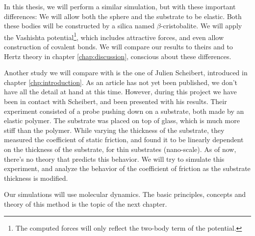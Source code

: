 \documentclass[twoside,english]{uiofysmaster}
\begin{document}
In this thesis, we will perform a similar simulation, but with these important differences: 
We will allow both the sphere and the substrate to be elastic. 
Both these bodies will be constructed by a silica named $\beta$-cristobalite.
We will apply the Vashishta potential\footnote{The computed forces will only reflect the two-body term of the potential.}, which includes attractive forces, and even allow construction of covalent bonds. 
We will compare our results to theirs and to Hertz theory in chapter \ref{chap:discussion}, conscious about these differences. 

Another study we will compare with is the one of Julien Scheibert, introduced in chapter \ref{chp:introduction}. 
As an article has not yet been published, we don't have all the detail at hand at this time. 
However, during this project we have been in contact with Scheibert, and been presented with his results. 
Their experiment consisted of a probe pushing down on a substrate, both made by an elastic polymer. 
The substrate was placed on top of glass, which is much more stiff than the polymer.
While varying the thickness of the substrate, they measured the coefficient of static friction, and found it to be linearly dependent on the thickness of the substrate, for thin substrates (nano-scale). 
As of now, there's no theory that predicts this behavior. 
We will try to simulate this experiment, and analyze the behavior of the coefficient of friction as the substrate thickness is modified.


Our simulations will use molecular dynamics. 
The basic principles, concepts and theory of this method is the topic of the next chapter. 
\end{document}
